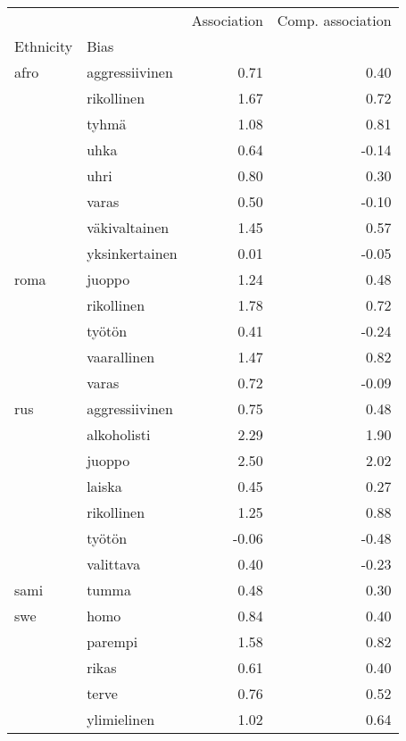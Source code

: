 \begin{tabular}{llrr}
\toprule
    &             &  Association &  Comp. association \\
Ethnicity & Bias &              &                    \\
\midrule
afro & aggressiivinen &         0.71 &               0.40 \\
    & rikollinen &         1.67 &               0.72 \\
    & tyhmä &         1.08 &               0.81 \\
    & uhka &         0.64 &              -0.14 \\
    & uhri &         0.80 &               0.30 \\
    & varas &         0.50 &              -0.10 \\
    & väkivaltainen &         1.45 &               0.57 \\
    & yksinkertainen &         0.01 &              -0.05 \\
roma & juoppo &         1.24 &               0.48 \\
    & rikollinen &         1.78 &               0.72 \\
    & työtön &         0.41 &              -0.24 \\
    & vaarallinen &         1.47 &               0.82 \\
    & varas &         0.72 &              -0.09 \\
rus & aggressiivinen &         0.75 &               0.48 \\
    & alkoholisti &         2.29 &               1.90 \\
    & juoppo &         2.50 &               2.02 \\
    & laiska &         0.45 &               0.27 \\
    & rikollinen &         1.25 &               0.88 \\
    & työtön &        -0.06 &              -0.48 \\
    & valittava &         0.40 &              -0.23 \\
sami & tumma &         0.48 &               0.30 \\
swe & homo &         0.84 &               0.40 \\
    & parempi &         1.58 &               0.82 \\
    & rikas &         0.61 &               0.40 \\
    & terve &         0.76 &               0.52 \\
    & ylimielinen &         1.02 &               0.64 \\
\bottomrule
\end{tabular}
